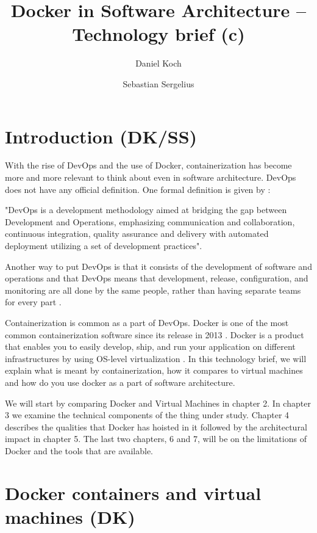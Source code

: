 \documentclass[fleqn,12pt]{olplainarticle}
\title{Docker in Software Architecture – Technology brief (c)}
\author[1]{Daniel Koch}
\author[2]{Sebastian Sergelius}
\affil[1]{daniel.koch@helsinki.fi}
\affil[2]{sebastian.sergelius@helsinki.fi}
\begin{document}
\flushbottom
\maketitle
\thispagestyle{empty}
\pagebreak
\tableofcontents
\section{Introduction (DK/SS)}

With the rise of DevOps and the use of Docker, containerization has become more and more relevant to think about even in software architecture. DevOps does not have any official definition.
One formal definition is given by \cite{Jabbari_devops}: 
\begin{displayquote}
"DevOps is a development methodology aimed at bridging the gap between Development and Operations, emphasizing communication and collaboration, continuous integration, quality assurance and delivery with automated deployment utilizing a set of development practices".
\end{displayquote}
Another way to put DevOps is that it consists of the development of software and operations and that DevOps means that development, release, configuration, and monitoring are all done by the same people, rather than having separate teams for every part \citep{hy:DevOps_with_Docker}.

Containerization is common as a part of DevOps. Docker is one of the most common containerization software since its release in 2013 \citep{aquasec:orchestration}. Docker is a product that enables you to easily develop, ship, and run your application on different infrastructures by using OS-level virtualization \citep{docker:overview}. In this technology brief, we will explain what is meant by containerization, how it compares to virtual machines and how do you use docker as a part of software architecture. 

We will start by comparing Docker and Virtual Machines in chapter 2. In chapter 3 we examine the technical components of the thing under study. Chapter 4 describes the qualities that Docker has hoisted in it followed by the architectural impact in chapter 5. The last two chapters, 6 and 7, will be on the limitations of Docker and the tools that are available.


\section{Docker containers and virtual machines (DK)}
\end{document}
